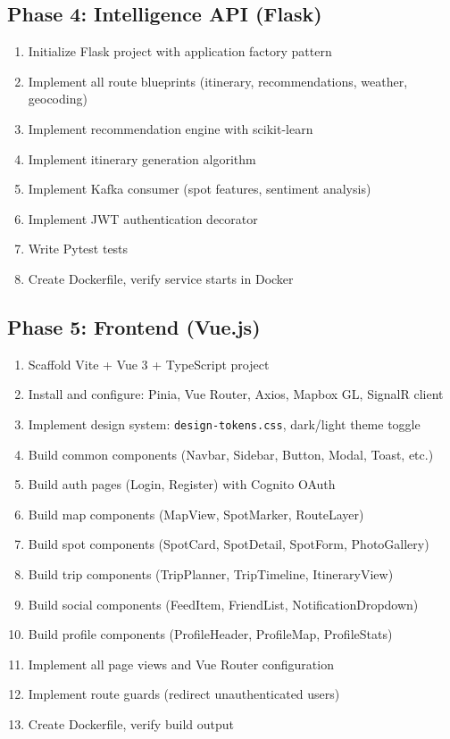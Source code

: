 \documentclass[12pt,letterpaper]{article}
\begin{document}
\subsection{Phase 4: Intelligence API (Flask)}
\begin{enumerate}
  \item Initialize Flask project with application factory pattern
  \item Implement all route blueprints (itinerary, recommendations, weather, geocoding)
  \item Implement recommendation engine with scikit-learn
  \item Implement itinerary generation algorithm
  \item Implement Kafka consumer (spot features, sentiment analysis)
  \item Implement JWT authentication decorator
  \item Write Pytest tests
  \item Create Dockerfile, verify service starts in Docker
\end{enumerate}

\subsection{Phase 5: Frontend (Vue.js)}
\begin{enumerate}
  \item Scaffold Vite + Vue 3 + TypeScript project
  \item Install and configure: Pinia, Vue Router, Axios, Mapbox GL, SignalR client
  \item Implement design system: \texttt{design-tokens.css}, dark/light theme toggle
  \item Build common components (Navbar, Sidebar, Button, Modal, Toast, etc.)
  \item Build auth pages (Login, Register) with Cognito OAuth
  \item Build map components (MapView, SpotMarker, RouteLayer)
  \item Build spot components (SpotCard, SpotDetail, SpotForm, PhotoGallery)
  \item Build trip components (TripPlanner, TripTimeline, ItineraryView)
  \item Build social components (FeedItem, FriendList, NotificationDropdown)
  \item Build profile components (ProfileHeader, ProfileMap, ProfileStats)
  \item Implement all page views and Vue Router configuration
  \item Implement route guards (redirect unauthenticated users)
  \item Create Dockerfile, verify build output
\end{enumerate}
\end{document}
